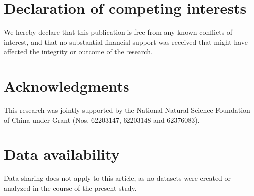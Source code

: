\documentclass[preprint,review,fleqn,sort&compress,3p]{elsarticle}
\theoremstyle{definition}%
\begin{document}
\section*{Declaration of competing interests}
We hereby declare that this publication is free from any known conflicts of interest, and that no substantial financial support was received that might have affected the integrity or outcome of the research.

\section*{Acknowledgments}
This research was jointly supported by the National Natural Science Foundation of China under Grant (Nos. 62203147, 62203148 and 62376083).

\section*{Data availability}
Data sharing does not apply to this article, as no datasets were created or analyzed in the course of the present study.

 
 
\end{document}
